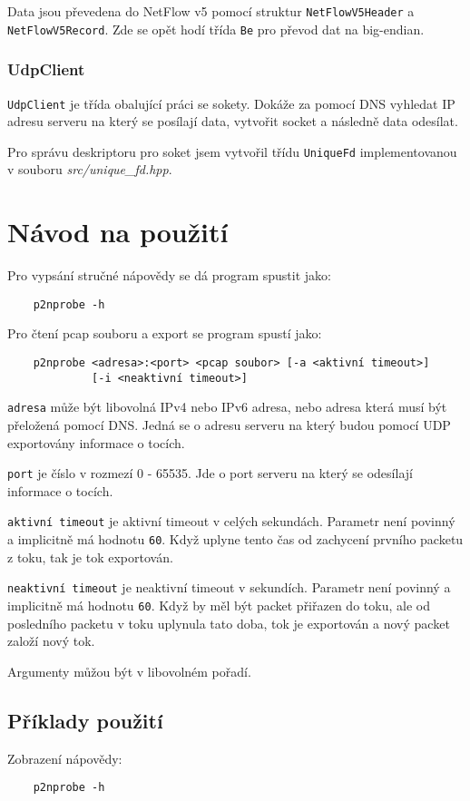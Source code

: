 \documentclass{article}
\begin{document}
Data jsou převedena do NetFlow v5 pomocí struktur
\verb|NetFlowV5Header| a \verb|NetFlowV5Record|. Zde se opět hodí třída
\verb|Be| pro převod dat na big-endian.

\subsubsection{UdpClient}
\verb|UdpClient| je třída obalující práci se sokety. Dokáže za pomocí DNS
vyhledat IP adresu serveru na který se posílají data, vytvořit socket a
následně data odesílat.

Pro správu deskriptoru pro soket jsem vytvořil třídu \verb|UniqueFd|
implementovanou v souboru \textit{src/unique\_fd.hpp}.

\section{Návod na použití}
Pro vypsání stručné nápovědy se dá program spustit jako:
\begin{verbatim}
    p2nprobe -h
\end{verbatim}

Pro čtení pcap souboru a export se program spustí jako:
\begin{verbatim}
    p2nprobe <adresa>:<port> <pcap soubor> [-a <aktivní timeout>]
             [-i <neaktivní timeout>]
\end{verbatim}
\verb|adresa| může být libovolná IPv4 nebo IPv6 adresa, nebo adresa která musí
být přeložená pomocí DNS. Jedná se o adresu serveru na který budou pomocí UDP
exportovány informace o tocích.

\verb|port| je číslo v rozmezí 0 - 65535. Jde o port serveru na který se
odesílají informace o tocích.

\verb|aktivní timeout| je aktivní timeout v celých sekundách. Parametr není
povinný a implicitně má hodnotu \verb|60|. Když uplyne tento čas od zachycení
prvního packetu z toku, tak je tok exportován.

\verb|neaktivní timeout| je neaktivní timeout v sekundích. Parametr není
povinný a implicitně má hodnotu \verb|60|. Když by měl být packet přiřazen do
toku, ale od posledního packetu v toku uplynula tato doba, tok je exportován
a nový packet založí nový tok.

Argumenty můžou být v libovolném pořadí.

\subsection{Příklady použití}
Zobrazení nápovědy:
\begin{verbatim}
    p2nprobe -h
\end{verbatim}
\end{document}
